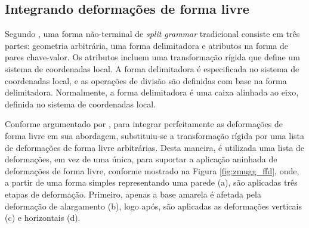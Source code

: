 \begin{figure}[h!]
	\centering
	\captionsetup{width=15cm}
	{}	
\end{figure}

\subsection{Integrando deformações de forma livre}
\label{sec:zmugg2014_sec3}

Segundo , uma forma não-terminal de \textit{split grammar} tradicional consiste em três partes: geometria arbitrária, uma forma delimitadora e atributos na forma de pares chave-valor. Os atributos incluem uma transformação rígida que define um sistema de coordenadas local. A forma delimitadora é especificada no sistema de coordenadas local, e as operações de divisão são definidas com base na forma delimitadora. Normalmente, a forma delimitadora é uma caixa alinhada ao eixo, definida no sistema de coordenadas local.

Conforme argumentado por , para integrar perfeitamente as deformações de forma livre em sua abordagem, substituiu-se a transformação rígida por uma lista de deformações de forma livre arbitrárias. Desta maneira, é utilizada uma lista de deformações, em vez de uma única, para suportar a aplicação aninhada de deformações de forma livre, conforme mostrado na Figura \ref{fig:zmugg_ffd}, onde, a partir de uma forma simples representando uma parede (a), são aplicadas três etapas de deformação. Primeiro, apenas a base amarela é afetada pela deformação de alargamento (b), logo após, são aplicadas as deformações verticais (c) e horizontais (d).

